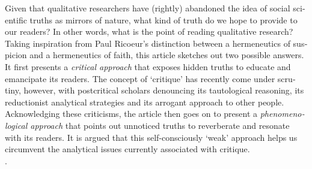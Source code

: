     \begin{adjmulticols}{1}{10mm}{10mm}
\label{paper4:abstract}
    \bigskip
    \begin{otherlanguage}{english}
    {\small
    \fadebreak

\noindent Given that qualitative researchers have (rightly) abandoned the idea of social scientific truths as mirrors of nature, what kind of truth do we hope to provide to our readers? In other words, what is the point of reading qualitative research? Taking inspiration from Paul Ricoeur’s distinction between a hermeneutics of suspicion and a hermeneutics of faith, this article sketches out two possible answers. It first presents a \textit{critical approach} that exposes hidden truths to educate and emancipate its readers. The concept of ‘critique’ has recently come under scrutiny, however, with postcritical scholars denouncing its tautological reasoning, its reductionist analytical strategies and its arrogant approach to other people. Acknowledging these criticisms, the article then goes on to present a \textit{phenomenological approach} that points out unnoticed truths to reverberate and resonate with its readers. It is argued that this self-consciously ‘weak’ approach helps us circumvent the analytical issues currently associated with critique.
%
\medskip
%
\\\hspace*{1.75em}{critique, interpretation, phenomenology, post-critique, resonance}.








    } %

    \fadebreak

    \end{otherlanguage}

    \end{adjmulticols}